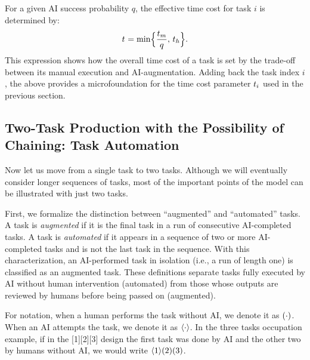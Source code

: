 \documentclass{article}
\theoremstyle{plain}
\theoremstyle{plain}
\begin{document}
For a given AI success probability $q$, the effective time cost for task $i$ is determined by:
$$t_{} = \min \Bigl\{\frac{t_{m}}{q},\, t_{h}\Bigr\}.$$
This expression shows how the overall time cost of a task is set by the trade-off between its manual execution and AI-augmentation.
Adding back the task index $i$, the above provides a microfoundation for the time cost parameter $t_{i}$ used in the previous section.



\subsection{Two-Task Production with the Possibility of Chaining: Task Automation}
Now let us move from a single task to two tasks.
Although we will eventually consider longer sequences of tasks, most of the important points of the model can be illustrated with just two tasks.

First, we formalize the distinction between ``augmented'' and ``automated'' tasks.  
A task is \emph{augmented} if it is the final task in a run of consecutive AI-completed tasks.  
A task is \emph{automated} if it appears in a sequence of two or more AI-completed tasks and is not the last task in the sequence.
With this characterization, an AI-performed task in isolation (i.e., a run of length one) is classified as an augmented task.
These definitions separate tasks fully executed by AI without human intervention (automated) from those whose outputs are reviewed by humans before being passed on (augmented).

For notation, when a human performs the task without AI, we denote it as $( \cdot )$.
When an AI attempts the task, we denote it as $\langle \cdot \rangle$.
In the three tasks occupation example, if in the [1][2][3] design the first task was done by AI and the other two by humans without AI, we would write $\langle 1 \rangle( 2 )( 3 )$.
\end{document}

